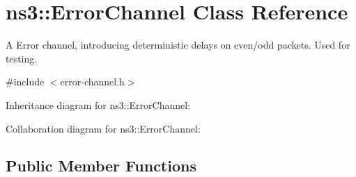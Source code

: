 \hypertarget{classns3_1_1ErrorChannel}{}\section{ns3\+:\+:Error\+Channel Class Reference}
\label{classns3_1_1ErrorChannel}


A Error channel, introducing deterministic delays on even/odd packets. Used for testing.  




{\ttfamily \#include $<$error-\/channel.\+h$>$}



Inheritance diagram for ns3\+:\+:Error\+Channel\+:


Collaboration diagram for ns3\+:\+:Error\+Channel\+:
\subsection*{Public Member Functions}
